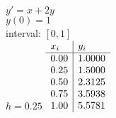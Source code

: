 {
$y' = x+2y$\\
$y(0)=1$\\
interval: $[0,1]$\\
$h=0.25$
}
{
	$\begin{array}[b]{l | l}
		x_i  & y_i    \\ \hline
		0.00    & 1.0000 \\
		0.25 & 1.5000 \\
		0.50  & 2.3125 \\
		0.75 & 3.5938 \\
		1.00  & 5.5781
	\end{array}$
}